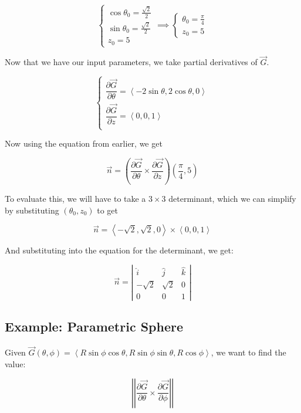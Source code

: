 \documentclass{article}
\newcommand{\norm}[1]{\left|\left|#1\right|\right|}
\begin{document}
\[
\begin{cases}
  \cos{\theta_0} = \frac{\sqrt{2}}{2} \\
  \sin{\theta_0} = \frac{\sqrt{2}}{2} \\
  z_0 = 5
\end{cases}
\implies
\begin{cases}
  \theta_0 = \frac{\pi}{4} \\
  z_0 = 5
\end{cases}
\]

Now that we have our input parameters, we take partial derivatives of $\vec{G}$.

\[
\begin{cases}
  \dfrac{\partial \vec{G}}{\partial \theta} = \left<-2 \sin \theta, 2 \cos{\theta}, 0\right> \\
  \dfrac{\partial \vec{G}}{\partial z} = \left<0, 0, 1\right> \\
\end{cases}
\]

Now using the equation from earlier, we get

\[
\vec{n} = \left(\dfrac{\partial \vec{G}}{\partial \theta} \times \dfrac{\partial \vec{G}}{\partial z}\right)(\frac{\pi}{4}, 5)
\]

To evaluate this, we will have to take a $3\times3$ determinant, which we can simplify by substituting $(\theta_0, z_0)$ to get

\[
\vec{n} = \left<-\sqrt{2}, \sqrt{2}, 0\right> \times \left<0, 0, 1\right>
\]

And substituting into the equation for the determinant, we get:

\[
\vec{n} = \left| \begin{array}{ccc}
  \hat{i}   & \hat{j}  & \hat{k} \\
  -\sqrt{2} & \sqrt{2} & 0       \\
  0         & 0        & 1
\end{array}\right|
\]

\subsection*{Example: Parametric Sphere}

Given $\vec{G}(\theta, \phi) = \left<R \sin{\phi} \cos{\theta}, R \sin{\phi} \sin{\theta}, R \cos{\phi}\right>$, we want to find the value:

\[
\norm{\dfrac{\partial \vec{G}}{\partial \theta} \times \dfrac{\partial \vec{G}}{\partial \phi}}
\]
\end{document}
